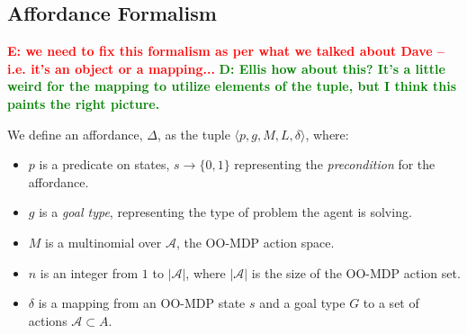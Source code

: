 \documentclass[conference]{IEEEtran}
\newcommand{\dnote}[1]{\textcolor{Green}{\textbf{D: #1}}}
\newcommand{\enote}[1]{\textcolor{Red}{\textbf{E: #1}}}
\begin{document}



\subsection{Affordance Formalism}

\enote{we need to fix this formalism as per what we talked about Dave -- i.e. it's an object or a mapping...}
\dnote{Ellis how about this? It's a little weird for the mapping to utilize elements of the tuple, but I think this
paints the right picture.}

 We define an affordance, $\Delta$, as the tuple $\langle p, g, M, L, \delta\rangle$,
where:
\begin{itemize}
\item $p$ is a predicate on states, $s \longrightarrow \{$0$, 1\}$ representing the {\em precondition} for the affordance. 
\item $g$ is a {\it goal type}, representing the type of problem the agent is solving.
\item $M$ is a multinomial over $\mathcal{A}$, the OO-MDP action space.
\item $n$ is an integer from $1$ to $|\mathcal{A}|$, where $|\mathcal{A}|$ is the size of the OO-MDP action set.
\item $\delta$ is a mapping from an OO-MDP state $s$ and a goal type $G$ to a set of actions $\mathcal{A} \subset A$.
\end{itemize}
\end{document}
